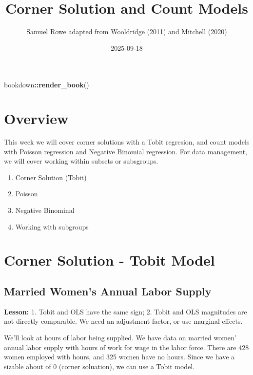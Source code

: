 \documentclass[
]{book}
\title{Corner Solution and Count Models}
\author{Samuel Rowe adapted from Wooldridge (2011) and Mitchell (2020)}
\date{2025-09-18}
\newenvironment{Shaded}{\begin{snugshade}}{\end{snugshade}}
\newcommand{\FunctionTok}[1]{\textcolor[rgb]{0.13,0.29,0.53}{\textbf{#1}}}
\newcommand{\NormalTok}[1]{#1}
\newcommand{\SpecialCharTok}[1]{\textcolor[rgb]{0.81,0.36,0.00}{\textbf{#1}}}
\providecommand{\tightlist}{%
  \setlength{\itemsep}{0pt}\setlength{\parskip}{0pt}}
\begin{document}
\maketitle

{
\setcounter{tocdepth}{1}
\tableofcontents
}
\begin{Shaded}
\begin{Highlighting}[]
\NormalTok{bookdown}\SpecialCharTok{::}\FunctionTok{render\_book}\NormalTok{()}
\end{Highlighting}
\end{Shaded}

\chapter*{Overview}\label{overview}

This week we will cover corner solutions with a Tobit regresion, and count models with Poisson regression and Negative Binomial regression. For data management, we will cover working within subsets or subsgroups.

\begin{enumerate}
\def\labelenumi{\arabic{enumi}.}
\tightlist
\item
  Corner Solution (Tobit)
\item
  Poisson
\item
  Negative Binominal
\item
  Working with subgroups
\end{enumerate}

\chapter{Corner Solution - Tobit Model}\label{corner-solution---tobit-model}

\section*{Married Women's Annual Labor Supply}\label{married-womens-annual-labor-supply}

\textbf{Lesson:}
1. Tobit and OLS have the same sign;
2. Tobit and OLS magnitudes are not directly comparable. We need an adjustment factor, or use marginal effects.

We'll look at hours of labor being supplied. We have data on married women' annual labor supply with hours of work for wage in the labor force. There are 428 women employed with hours, and 325
women have no hours. Since we have a sizable about of 0 (corner soluation), we can use a Tobit model.
\end{document}
